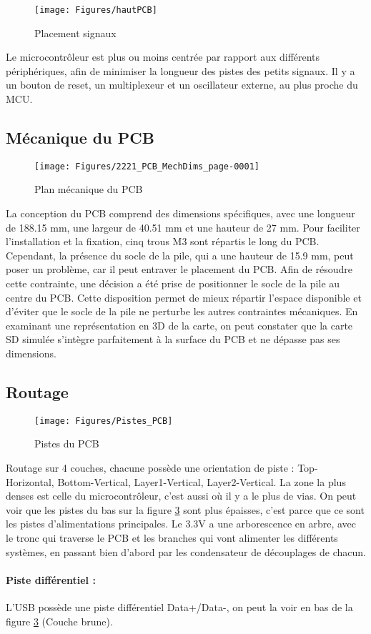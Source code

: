 {\begin{figure}[h]
	\centering
	\texttt{[image: Figures/hautPCB]}
	\caption{Placement signaux}
	\label{fig:hautpcb}
\end{figure}

Le microcontrôleur est plus ou moins centrée par rapport aux différents périphériques, afin de minimiser la longueur des pistes des petits signaux. Il y a un bouton de reset, un multiplexeur et un oscillateur externe, au plus proche du MCU.
}
\clearpage

\subsection{Mécanique du PCB}
{

	\begin{figure}[h]
		\centering
		\texttt{[image: Figures/2221\_PCB\_MechDims\_page-0001]}
		\caption{Plan mécanique du PCB}
		\label{fig:2221pcbmechdimspage-0001}
	\end{figure}
	La conception du PCB comprend des dimensions spécifiques, avec une longueur de 188.15 mm, une largeur de 40.51 mm et une hauteur de 27 mm. Pour faciliter l'installation et la fixation, cinq trous M3 sont répartis le long du PCB. Cependant, la présence du socle de la pile, qui a une hauteur de 15.9 mm, peut poser un problème, car il peut entraver le placement du PCB.
	Afin de résoudre cette contrainte, une décision a été prise de positionner le socle de la pile au centre du PCB. Cette disposition permet de mieux répartir l'espace disponible et d'éviter que le socle de la pile ne perturbe les autres contraintes mécaniques.
	En examinant une représentation en 3D de la carte, on peut constater que la carte SD simulée s'intègre parfaitement à la surface du PCB et ne dépasse pas ses dimensions.
}

\clearpage
\subsection{Routage} \label{ssec:routage}
{
	\begin{figure}[h]
		\centering
		\texttt{[image: Figures/Pistes\_PCB]}
		\caption{Pistes du PCB}
		\label{fig:pistespcb}
	\end{figure}
	
	Routage sur 4 couches, chacune possède une orientation de piste : Top-Horizontal, Bottom-Vertical, Layer1-Vertical, Layer2-Vertical. La zone la plus denses est celle du microcontrôleur, c'est aussi où il y a le plus de vias. On peut voir que les pistes du bas sur la figure \ref{fig:pistespcb} sont plus épaisses, c'est parce que ce sont les pistes d'alimentations principales. Le 3.3V a une arborescence en arbre, avec le tronc qui traverse le PCB et les branches qui vont alimenter les différents systèmes, en passant bien d'abord par les condensateur de découplages de chacun. 
	\paragraph{Piste différentiel :} L'USB possède une piste différentiel Data+/Data-, on peut la voir en bas de la figure \ref{fig:pistespcb} (Couche brune).
}
\clearpage

